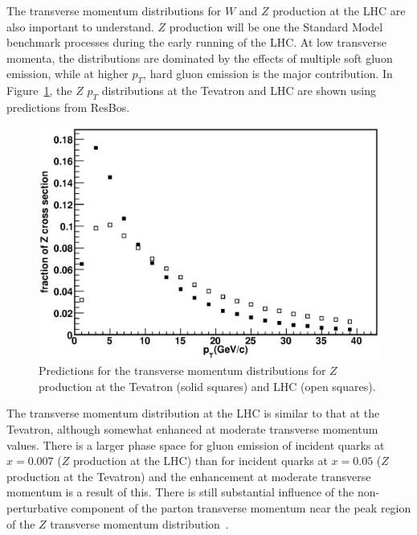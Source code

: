 \documentclass[12pt]{iopart}
\begin{document}
The transverse momentum distributions for $W$ and $Z$ production at the LHC are also important to understand. $Z$ production will be one the Standard Model benchmark processes during the early running of the LHC. At low transverse momenta, the distributions are dominated by
the effects of multiple soft gluon emission, while at higher $p_T$, hard gluon emission is the major contribution. In
Figure~\ref{fig:z_pt}, the $Z$ $p_T$ distributions at the Tevatron and LHC are shown using predictions from ResBos.
%
\begin{figure}[t]
\begin{center}
\includegraphics[width=12cm]{z_pt.eps}
\end{center}
\vspace*{-1cm}
\caption{
Predictions for the transverse momentum distributions for $Z$ production at the Tevatron (solid squares) and LHC (open squares).  } 
\label{fig:z_pt}
\end{figure}
%
The transverse momentum distribution at the LHC is similar to that at the Tevatron, although somewhat enhanced at moderate transverse momentum values. 
There is a larger  phase space for
gluon emission of incident quarks at $x=0.007$ ($Z$ production at the LHC) than for incident quarks at $x=0.05$ ($Z$
production at the Tevatron) and the enhancement at moderate transverse momentum is a result of this. There is still substantial
influence of the non-perturbative component of the parton transverse momentum near the peak region of the $Z$ transverse momentum
distribution~\cite{Balazs:2000sz}. 
\end{document}
